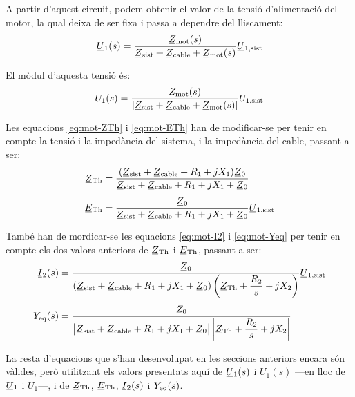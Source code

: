 A partir d'aquest circuit, podem obtenir  el valor de la tensió d'alimentació del motor, la qual deixa de ser fixa i passa a dependre del  lliscament:
\begin{equation}
	\cmplx{U}_1(s) = \frac{\cmplx{Z}\ped{mot}(s)}{\cmplx{Z}\ped{sist} + \cmplx{Z}\ped{cable} +  \cmplx{Z}\ped{mot}(s)} \cmplx{U}\ped{1,sist}\label{eq:mot-U-redu}
\end{equation}

El mòdul d'aquesta tensió és:
\begin{equation}
	U_1(s) = \frac{Z\ped{mot}(s)}{|\cmplx{Z}\ped{sist} + \cmplx{Z}\ped{cable} +  \cmplx{Z}\ped{mot}(s)|} U\ped{1,sist}
\end{equation}

Les equacions \eqref{eq:mot-ZTh} i  \eqref{eq:mot-ETh} han de modificar-se per tenir en compte la tensió i la impedància del sistema, i la impedància del cable, passant a ser:
\begin{subequations}
	\begin{align}
		\cmplx{Z}\ped{Th} &= \frac{(\cmplx{Z}\ped{sist} + \cmplx{Z}\ped{cable} + R_1 + j X_1) \cmplx{Z}_0}{\cmplx{Z}\ped{sist} + \cmplx{Z}\ped{cable} + R_1 + j X_1 + \cmplx{Z}_0} \label{eq:mot-ZTh-redu}\\[1ex]
		\cmplx{E}\ped{Th} &= \frac{\cmplx{Z}_0}{\cmplx{Z}\ped{sist} + \cmplx{Z}\ped{cable} + R_1 + j X_1 + \cmplx{Z}_0} \cmplx{U}\ped{1,sist} \label{eq:mot-ETh-redu}
	\end{align}
\end{subequations}

També han de mordicar-se les equacions \eqref{eq:mot-I2} i \eqref{eq:mot-Yeq} per tenir en compte els dos valors anteriors de $\cmplx{Z}\ped{Th}$ i $\cmplx{E}\ped{Th}$, passant a ser:
\begin{align}
	\cmplx{I}_2(s) &= \frac{\cmplx{Z}_0}{(\cmplx{Z}\ped{sist} + \cmplx{Z}\ped{cable} + R_1 + j X_1 + \cmplx{Z}_0)\left(\cmplx{Z}\ped{Th} + \dfrac{R_2}{s} + j X_2\right)} \cmplx{U}\ped{1,sist} \\[1ex]
	Y\ped{eq}(s) &= \frac{Z_0}{\big|\cmplx{Z}\ped{sist} + \cmplx{Z}\ped{cable} + R_1 + j X_1 + \cmplx{Z}_0\big|\left|\cmplx{Z}\ped{Th} + \dfrac{R_2}{s} + j X_2\right|} \label{eq:mot-Yeq-redu}
\end{align}

La resta d'equacions que s'han desenvolupat en les seccions anteriors encara són vàlides, però utilitzant els valors presentats aquí de $\cmplx{U}_1(s)$ i $U_1(s)$ ---en lloc de  $\cmplx{U}_1$ i  $U_1$---, i de $\cmplx{Z}\ped{Th}$, $\cmplx{E}\ped{Th}$, $\cmplx{I}_2(s)$ i $Y_\mathrm{eq}(s)$. 


